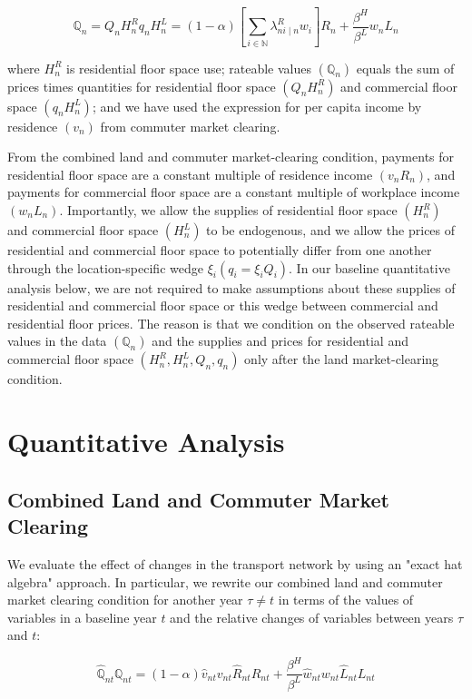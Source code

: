 \begin{equation}
    \mathbb{Q}_n = Q_n H_n^R q_n H_n^L = (1 - \alpha) \left[ \sum_{i \in \mathbb{N}} \lambda_{ni \mid n}^R w_i \right] R_n + \frac{\beta^H}{\beta^L} w_n L_n
\end{equation}

where $H_n^R$ is residential floor space use; rateable values $(\mathbb{Q}_n)$ equals the sum of prices times quantities for residential floor space $(Q_n H_n^R)$ and commercial floor space $(q_n H_n^L)$; and we have used the expression for per capita income by residence $(v_n)$ from commuter market clearing.

From the combined land and commuter market-clearing condition, payments for residential floor space are a constant multiple of residence income $(v_n R_n)$, and payments for commercial floor space are a constant multiple of workplace income $(w_n L_n)$. Importantly, we allow the supplies of residential floor space $(H_n^R)$ and commercial floor space $(H_n^L)$ to be endogenous, and we allow the prices of residential and commercial floor space to potentially differ from one another through the location-specific wedge $\xi_i(q_i = \xi_i Q_i)$. In our baseline quantitative analysis below, we are not required to make assumptions about these supplies of residential and commercial floor space or this wedge between commercial and residential floor prices. The reason is that we condition on the observed rateable values in the data $(\mathbb{Q}_n)$ and the supplies and prices for residential and commercial floor space $(H_n^R, H_n^L, Q_n, q_n)$ only after the land market-clearing condition.

\section{Quantitative Analysis}

\subsection{Combined Land and Commuter Market Clearing}

We evaluate the effect of changes in the transport network by using an "exact hat algebra" approach. In particular, we rewrite our combined land and commuter market clearing condition for another year $\tau \neq t$ in terms of the values of variables in a baseline year $t$ and the relative changes of variables between years $\tau$ and $t$:

\begin{equation}
    \hat{\mathbb{Q}}_{nt} \mathbb{Q}_{nt} = (1 - \alpha) \hat{v}_{nt} v_{nt} \hat{R}_{nt} R_{nt} + \frac{\beta^H}{\beta^L} \hat{w}_{nt} w_{nt} \hat{L}_{nt} L_{nt}
\end{equation}

